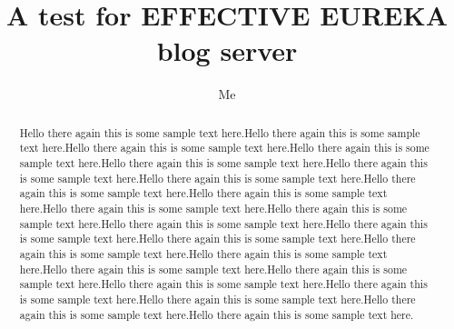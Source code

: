 \documentclass{article}
\begin{document}
\title{A test for EFFECTIVE EUREKA blog server}
\author{Me}

\maketitle

\begin{abstract}
	Hello there again this is some sample text here.Hello there again this is some sample text here.Hello there again this is some sample text here.Hello there again this is some sample text here.Hello there again this is some sample text here.Hello there again this is some sample text here.Hello there again this is some sample text here.Hello there again this is some sample text here.Hello there again this is some sample text here.Hello there again this is some sample text here.Hello there again this is some sample text here.Hello there again this is some sample text here.Hello there again this is some sample text here.Hello there again this is some sample text here.Hello there again this is some sample text here.Hello there again this is some sample text here.Hello there again this is some sample text here.Hello there again this is some sample text here.Hello there again this is some sample text here.Hello there again this is some sample text here.Hello there again this is some sample text here.Hello there again this is some sample text here.Hello there again this is some sample text here.
\end{abstract}
\end{document}
